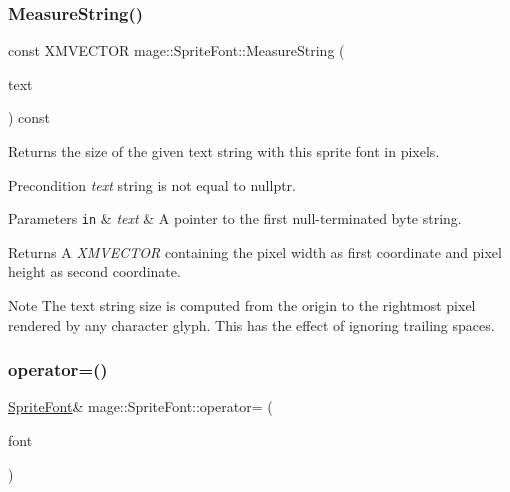 \subsubsection{\texorpdfstring{Measure\+String()}{MeasureString()}}
{\footnotesize\ttfamily const X\+M\+V\+E\+C\+T\+OR mage\+::\+Sprite\+Font\+::\+Measure\+String (\begin{DoxyParamCaption}\item[{const wchar\+\_\+t $\ast$}]{text }\end{DoxyParamCaption}) const}

Returns the size of the given text string with this sprite font in pixels.

\begin{DoxyPrecond}{Precondition}
{\itshape text} string is not equal to {\ttfamily nullptr}. 
\end{DoxyPrecond}

\begin{DoxyParams}[1]{Parameters}
\mbox{\tt in}  & {\em text} & A pointer to the first null-\/terminated byte string. \\
\hline
\end{DoxyParams}
\begin{DoxyReturn}{Returns}
A {\itshape X\+M\+V\+E\+C\+T\+OR} containing the pixel width as first coordinate and pixel height as second coordinate. 
\end{DoxyReturn}
\begin{DoxyNote}{Note}
The text string size is computed from the origin to the rightmost pixel rendered by any character glyph. This has the effect of ignoring \textquotesingle{}trailing spaces\textquotesingle{}. 
\end{DoxyNote}
\hypertarget{classmage_1_1_sprite_font_a3f95359a336adc87088eefe3103a770b}{}\label{classmage_1_1_sprite_font_a3f95359a336adc87088eefe3103a770b} 
\subsubsection{\texorpdfstring{operator=()}{operator=()}\hspace{0.1cm}{\footnotesize\ttfamily [1/2]}}
{\footnotesize\ttfamily \hyperlink{classmage_1_1_sprite_font}{Sprite\+Font}\& mage\+::\+Sprite\+Font\+::operator= (\begin{DoxyParamCaption}\item[{const \hyperlink{classmage_1_1_sprite_font}{Sprite\+Font} \&}]{font }\end{DoxyParamCaption})\hspace{0.3cm}{\ttfamily [delete]}}

